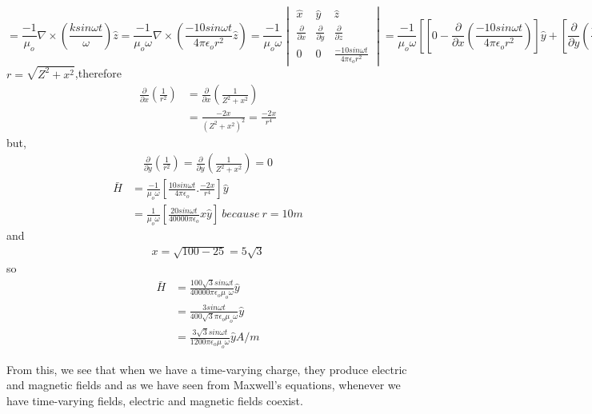 \begin{exmp}
\begin{dmath*}
= \frac{-1}{\mu_o} \nabla\times\left(\frac{ksin\omega t}{\omega} \right)\hat{z}
= \frac{-1}{\mu_o\omega}\nabla\times\left(\frac{-10sin\omega t}{4\pi\epsilon_o r^2} \hat{z}\right)=\frac{-1}{\mu_o\omega}\begin{vmatrix}
\hat{x} &\hat{y} &\hat{z}\\
\frac{\partial}{\partial x} & \frac{\partial}{\partial y} & \frac{\partial}{\partial z} \\
0 &0 &\frac{-10sin\omega t}{4\pi\epsilon_o r^2}
\end{vmatrix}
= \frac{-1}{\mu_o\omega}\left[\left[  0 - \frac{\partial}{\partial x}\left( \frac{-10sin\omega t}{4\pi \epsilon_o r^2}\right)  \right]\hat{y} + \left[ \frac{\partial}{\partial y}\left(\frac{-10sin\omega t}{4 \pi\epsilon_o r^2} \right)\hat{x}\right]\right] 
\end{dmath*}
$r = \sqrt{Z^2 + x^2}$,therefore
\begin{align*}
\frac{\partial }{\partial x}\left(\frac{1}{r^2} \right) &=  \frac{\partial }{\partial x}\left(\frac{1}{Z^2 + x^2} \right)\\
&= \frac{-2x}{(Z^2 + x^2)^2} = \frac{-2x}{r^4} 
\end{align*}
but,
\begin{align*}
\frac{\partial}{\partial y}\left(\frac{1}{r^2} \right) = \frac{\partial}{\partial y}\left(\frac{1}{Z^2 + x^2} \right) = 0  
\end{align*}
\begin{align*}
\bar{H} &= \frac{-1}{\mu_o\omega}\left[ \frac{10sin\omega t}{4\pi\epsilon_o}.\frac{-2x}{r^4}\right]\hat{y} \\
&= \frac{1}{\mu_o\omega}\left[ \frac{20sin\omega t}{40000\pi\epsilon_o}x\hat{y}\right] \ because\ r = 10m 
\end{align*}
and
\begin{align*}
x = \sqrt{100 - 25} = 5\sqrt{3}
\end{align*}
so
\begin{align*}
\bar{H} &=  \frac{100\sqrt{3}sin\omega t}{40000\pi\epsilon_o\mu_o\omega}\hat{y}\\
&= \frac{3sin\omega t}{400\sqrt{3}\pi\epsilon_o\mu_o\omega}\hat{y} \\
&= \frac{3\sqrt{3}sin\omega t}{1200\pi\epsilon_o\mu_o\omega}\hat{y}  A/m
\end{align*}
\end{exmp}

From this, we see that when we have a time-varying charge, they produce electric and magnetic fields and as we have seen from Maxwell's equations, whenever we have time-varying fields, electric and magnetic fields coexist.

